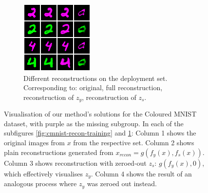 \begin{figure}[tb]
\begin{subfigure}[b]{0.39\textwidth}
    \includegraphics[width=\textwidth]{paper3/example_images/fresh-dawn-2179_context_reconstructions_9900.png}
    \caption{
    Different reconstructions on the deployment set.
    Corresponding to: original, full reconstruction, reconstruction of $z_y$, reconstruction of $z_s$.
    }%
    \label{fig:cmnist-recon-deployment}
  \end{subfigure}
  \caption{
   Visualisation of our method's solutions for the Coloured MNIST dataset, with {\color{purple}purple} as the missing subgroup.
   In each of the subfigures \ref{fig:cmnist-recon-training} and \ref{fig:cmnist-recon-deployment}:
   Column 1 shows the original images from $x$ from the respective set.
   Column 2 shows plain reconstructions generated from $x_\textit{recon}=g(f_y(x), f_s(x))$.
   Column 3 shows reconstruction with zeroed-out $z_s$: $g(f_y(x), 0)$, which effectively visualises $z_y$.
   Column 4 shows the result of an analogous process where $z_y$ was zeroed out instead.
  }%
  \label{fig:cmnist-recon}
\end{figure}

